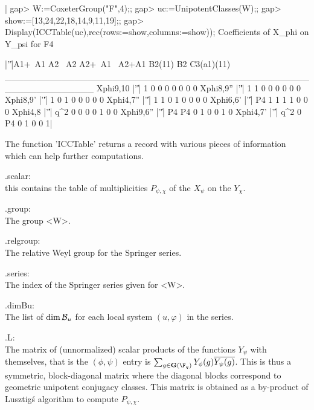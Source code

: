 |    gap> W:=CoxeterGroup("F",4);;
    gap> uc:=UnipotentClasses(W);;
    gap> show:=[13,24,22,18,14,9,11,19];;
    gap> Display(ICCTable(uc),rec(rows:=show,columns:=show));
    Coefficients of X_phi on Y_psi for F4

                |'\|'|A1+~A1 A2 ~A2 A2+~A1 ~A2+A1 B2(11) B2 C3(a1)(11)
    ______________________________________________________________
    Xphi{9,10}  |'\|'|     1  0   0      0      0      0  0          0
    Xphi{8,9}'' |'\|'|     1  1   0      0      0      0  0          0
    Xphi{8,9}'  |'\|'|     1  0   1      0      0      0  0          0
    Xphi{4,7}'' |'\|'|     1  1   0      1      0      0  0          0
    Xphi{6,6}'  |'\|'|    P4  1   1      1      1      0  0          0
    Xphi{4,8}   |'\|'|   q^2  0   0      0      0      1  0          0
    Xphi{9,6}'' |'\|'|    P4 P4   0      1      0      0  1          0
    Xphi{4,7}'  |'\|'|   q^2  0  P4      0      1      0  0          1|

The function 'ICCTable' returns a record with various pieces of information
which can help further computations.

.scalar:\\ this contains the table of multiplicities $P_{\psi,\chi}$ of the
$X_\psi$ on the $Y_\chi$.

.group:\\ The group <W>.

.relgroup:\\ The relative Weyl group for the Springer series.

.series:\\ The index of the Springer series given for <W>.

.dimBu:\\  The list of  $\dim{\mathcal B}_u$ for each  local system $(u,\varphi)$ in
the series.

.L:\\  The  matrix  of  (unnormalized)  scalar  products  of  the functions
$Y_\psi$   with   themselves,   that   is   the   $(\phi,\psi)$   entry  is
$\sum_{g\in\bG(\F_q)}  Y_\phi(g)  \overline{Y_\psi(g)}$.  This  is  thus  a
symmetric,  block-diagonal matrix  where the  diagonal blocks correspond to
geometric  unipotent  conjugacy  classes.  This  matrix  is  obtained  as a
by-product of Lusztig\'s algorithm to compute $P_{\psi,\chi}$.

%
%
%
%
